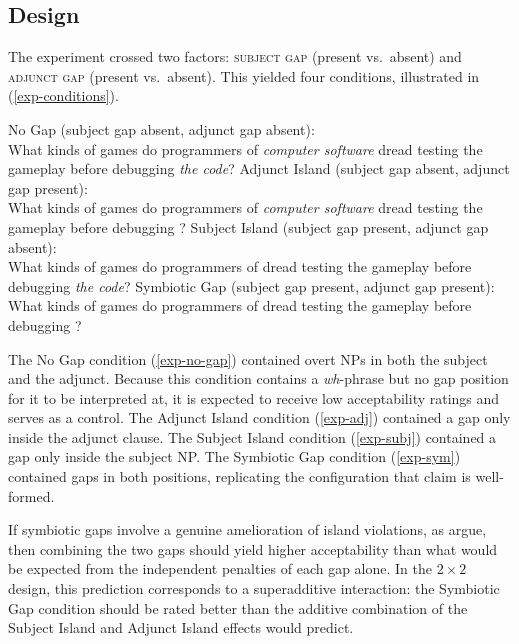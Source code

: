 \documentclass[12pt]{article}
\begin{document}
\subsection{Design}\label{sec:exp-design}

The experiment crossed two factors: \textsc{subject gap} (present vs.\ absent) and \textsc{adjunct gap} (present vs.\ absent). This yielded four conditions, illustrated in (\ref{exp-conditions}).

\pex\label{exp-conditions}
\a\label{exp-no-gap} No Gap (subject gap absent, adjunct gap absent):\\
What kinds of games do programmers of \emph{computer software} dread testing the gameplay before debugging \emph{the code}?
\a\label{exp-adj} Adjunct Island (subject gap absent, adjunct gap present):\\
What kinds of games do programmers of \emph{computer software} dread testing the gameplay before debugging \underline{\hspace{1em}}?
\a\label{exp-subj} Subject Island (subject gap present, adjunct gap absent):\\
What kinds of games do programmers of \underline{\hspace{1em}} dread testing the gameplay before debugging \emph{the code}?
\a\label{exp-sym} Symbiotic Gap (subject gap present, adjunct gap present):\\
What kinds of games do programmers of \underline{\hspace{1em}} dread testing the gameplay before debugging \underline{\hspace{1em}}?
\xe

\noindent The No Gap condition (\ref{exp-no-gap}) contained overt NPs in both the subject and the adjunct. Because this condition contains a \emph{wh}-phrase but no gap position for it to be interpreted at, it is expected to receive low acceptability ratings and serves as a control. The Adjunct Island condition (\ref{exp-adj}) contained a gap only inside the adjunct clause. The Subject Island condition (\ref{exp-subj}) contained a gap only inside the subject NP. The Symbiotic Gap condition (\ref{exp-sym}) contained gaps in both positions, replicating the configuration that \citeauthor{levine2003} claim is well-formed.

If symbiotic gaps involve a genuine amelioration of island violations, as \citeauthor{levine2003} argue, then combining the two gaps should yield higher acceptability than what would be expected from the independent penalties of each gap alone. In the $2 \times 2$ design, this prediction corresponds to a superadditive interaction: the Symbiotic Gap condition should be rated better than the additive combination of the Subject Island and Adjunct Island effects would predict.
\end{document}
